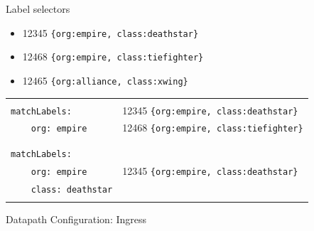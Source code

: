 \documentclass[black,white]{beamer}
\DeclareRobustCommand{\#}{\adjustbox{valign=B,totalheight=.57\baselineskip}{\oldhash}}%
\begin{document}
    \begin{frame}[fragile]{Label selectors}
        \vfill
        \begin{itemize}
            \item 12345 \verb+{org:empire, class:deathstar}+ \smallskip
            \item 12468 \verb+{org:empire, class:tiefighter}+ \smallskip
            \item 12465 \verb+{org:alliance, class:xwing}+ \smallskip
        \end{itemize}
        \vfill
        \begin{tabularx}{\textwidth}{l|l}
            \hline
            & \\
            \verb+matchLabels:+ & 12345 \verb+{org:empire, class:deathstar}+ \\
            \verb+    org: empire+ & 12468 \verb+{org:empire, class:tiefighter}+ \\
            & \\
            \hline
            & \\
            \verb+matchLabels:+ & \\
            \verb+    org: empire+ & 12345 \verb+{org:empire, class:deathstar}+ \\
            \verb+    class: deathstar+ & \\
            & \\
            \hline
        \end{tabularx}
        \vfill
    \end{frame}

    \begin{frame}{Datapath Configuration: Ingress}
        \vfill
        \begin{figure}
            
        \end{figure}
        \vfill
    \end{frame}
\end{document}
